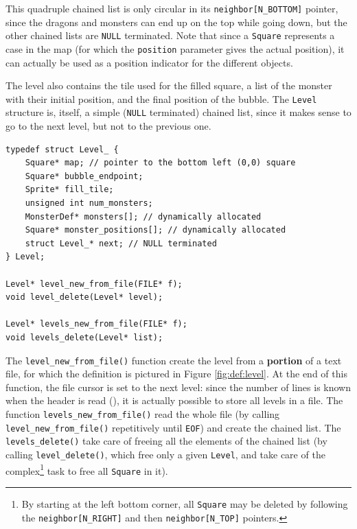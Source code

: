 \documentclass[12pt,a4paper]{article}
\begin{document}
This quadruple chained list is only circular in its \texttt{neighbor[N_BOTTOM]} pointer, since the dragons and monsters can end up on the top while going down, but the other chained lists are \texttt{NULL} terminated. Note that since a \texttt{Square} represents a case in the map (for which the \texttt{position} parameter gives the actual position), it can actually be used as a position indicator for the different objects. 

The level also contains the tile used for the filled square, a list of the monster with their initial position, and the final position of the bubble. The \texttt{Level} structure is, itself, a simple (\texttt{NULL} terminated) chained list, since it makes sense to go to the next level, but not to the previous one.

\begin{verbatim}
typedef struct Level_ {
	Square* map; // pointer to the bottom left (0,0) square
	Square* bubble_endpoint;
	Sprite* fill_tile;
	unsigned int num_monsters; 
	MonsterDef* monsters[]; // dynamically allocated
	Square* monster_positions[]; // dynamically allocated
	struct Level_* next; // NULL terminated
} Level;

Level* level_new_from_file(FILE* f);
void level_delete(Level* level);

Level* levels_new_from_file(FILE* f);
void levels_delete(Level* list);
\end{verbatim}

The \texttt{level_new_from_file()} function create the level from a \textbf{portion} of a text file, for which the definition is pictured in Figure \ref{fig:def:level}. At the end of this function, the file cursor is set to the next level: since the number of lines is known when the header is read (), it is actually possible to store all levels in a file. The function \texttt{levels_new_from_file()} read the whole file (by calling \texttt{level_new_from_file()} repetitively until \texttt{EOF}) and create the chained list. The \texttt{levels_delete()} take care of freeing all the elements of the chained list (by calling \texttt{level_delete()}, which free only a given \texttt{Level}, and take care of the complex\footnote{By starting at the left bottom corner, all \texttt{Square} may be deleted by following the \texttt{neighbor[N_RIGHT]} and then \texttt{neighbor[N_TOP]} pointers.} task to free all \texttt{Square} in it).
\end{document}
